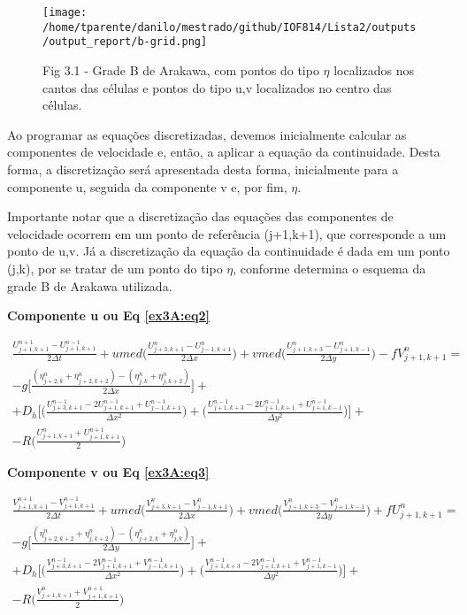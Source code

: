 \documentclass[11pt]{article}
\makeatletter
\def\maxwidth{\ifdim\Gin@nat@width>\linewidth\linewidth
    \else\Gin@nat@width\fi}
\let\Oldincludegraphics\includegraphics
\renewcommand{\includegraphics}[1]{\Oldincludegraphics[width=.8\maxwidth]{#1}}
\makeatother
\begin{document}
\begin{figure}
\centering
\centerline{\hbox{\texttt{[image: /home/tparente/danilo/mestrado/github/IOF814/Lista2/outputs/output\_report/b-grid.png]}}}
\caption{Fig 3.1 - Grade B de Arakawa, com pontos do tipo \(\eta\) localizados nos cantos das células
e pontos do tipo u,v localizados no centro das células. }
\label{ex3A:fig1}
\end{figure}

Ao programar as equações discretizadas, devemos inicialmente calcular as
componentes de velocidade e, então, a aplicar a equação da continuidade.
Desta forma, a discretização será apresentada desta forma, inicialmente
para a componente u, seguida da componente v e, por fim, \(\eta\).

Importante notar que a discretização das equações das componentes de
velocidade ocorrem em um ponto de referência (j+1,k+1), que corresponde
a um ponto de u,v. Já a discretização da equação da continuidade é dada
em um ponto (j,k), por se tratar de um ponto do tipo \(\eta\), conforme
determina o esquema da grade B de Arakawa utilizada.

\textbf{Componente u ou Eq \ref{ex3A:eq2}}

\begin{equation}
\begin{aligned}
\frac{U^{n+1}_{j+1,k+1} - U^{n-1}_{j+1,k+1}}{2\Delta{t}} + umed\bigg( \frac{U^{n}_{j+3,k+1} - U^{n}_{j-1,k+1}}{2\Delta{x}} \bigg) + vmed\bigg( \frac{U^{n}_{j+1,k+3} - U^{n}_{j+1,k-1}}{2\Delta{y}} \bigg) - fV^{n}_{j+1,k+1} = \\
-g\bigg[  \frac{(\eta^{n}_{j+2,k} + \eta^{n}_{j+2,k+2}) -(\eta^{n}_{j,k} + \eta^{n}_{j,k+2} ) }{2\Delta{x}}  \bigg] + \\
+ D_h\bigg[ \bigg( \frac{U^{n-1}_{j+3,k+1} - 2U^{n-1}_{j+1,k+1} + U^{n-1}_{j-1,k+1}}{\Delta{x^2}} \bigg) + \bigg( \frac{U^{n-1}_{j+1,k+3} -2U^{n-1}_{j+1,k+1} + U^{n-1}_{j+1,k-1}}{\Delta{y^2}} \bigg) \bigg] + \\
- R\bigg( \frac{U^{n}_{j+1,k+1} + U^{n+1}_{j+1,k+1}}{2} \bigg)
\label{ex3A:eq4}
\end{aligned}
\end{equation}

\textbf{Componente v ou Eq \ref{ex3A:eq3}}

\begin{equation}
\begin{aligned}
\frac{V^{n+1}_{j+1,k+1} - V^{n-1}_{j+1,k+1}}{2\Delta{t}} + umed\bigg( \frac{V^{n}_{j+3,k+1} - V^{n}_{j-1,k+1}}{2\Delta{x}} \bigg) + vmed\bigg( \frac{V^{n}_{j+1,k+3} - V^{n}_{j+1,k-1}}{2\Delta{y}} \bigg) + fU^{n}_{j+1,k+1} = \\
-g\bigg[ \frac{(\eta^{n}_{j+2,k+2} + \eta^{n}_{j,k+2}) - (\eta^{n}_{j+2,k} + \eta^{n}_{j,k} ) }{2\Delta{y}}  \bigg] + \\
+ D_h\bigg[ \bigg( \frac{V^{n-1}_{j+3,k+1} - 2V^{n-1}_{j+1,k+1} + V^{n-1}_{j-1,k+1}}{\Delta{x^2}} \bigg) + \bigg( \frac{V^{n-1}_{j+1,k+3} -2V^{n-1}_{j+1,k+1} + V^{n-1}_{j+1,k-1}}{\Delta{y^2}} \bigg) \bigg] + \\
- R\bigg( \frac{V^{n}_{j+1,k+1} + V^{n+1}_{j+1,k+1}}{2} \bigg)
\label{ex3A:eq5}
\end{aligned}
\end{equation}
\end{document}
